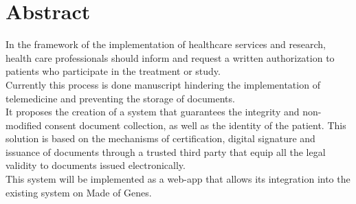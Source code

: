 \chapter*{Abstract}
In the framework of the implementation of healthcare services and research, health care professionals should inform and request a written authorization to patients who participate in the treatment or study.\\
\newline Currently this process is done manuscript hindering the implementation of telemedicine and preventing the storage of documents. \\
\newline It proposes the creation of a system that guarantees the integrity and non-modified consent document collection, as well as the identity of the patient. This solution is based on the mechanisms of certification, digital signature and issuance of documents through a trusted third party that equip all the legal validity to documents issued electronically.\\
\newline This system will be implemented as a web-app that allows its integration into the existing system on Made of Genes.

